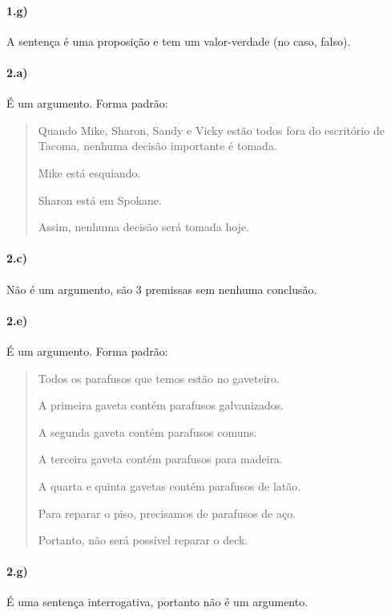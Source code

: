\documentclass[pdftex,a4paper,12pt,brazil]{article} %
\begin{document}
\paragraph{1.g)} A sentença é uma proposição e tem um valor-verdade (no caso, falso).

\paragraph{2.a)} É um argumento. Forma padrão:

\begin{quote}
  Quando Mike, Sharon, Sandy e Vicky estão todos fora do escritório de Tacoma,
  nenhuma decisão importante é tomada.

  Mike está esquiando.

  Sharon está em Spokane.
  
  \vspace{-0.5cm}
  \noindent\hrulefill
  
  Assim, nenhuma decisão será tomada hoje.
\end{quote}

\paragraph{2.c)} Não é um argumento, são 3 premissas sem nenhuma conclusão.

\paragraph{2.e)} É um argumento. Forma padrão:

\begin{quote}
  Todos os parafusos que temos estão no gaveteiro.

  A primeira gaveta contém parafusos galvanizados.

  A segunda gaveta contém parafusos comuns.

  A terceira gaveta contém parafusos para madeira.

  A quarta e quinta gavetas contém parafusos de latão.

  Para reparar o piso, precisamos de parafusos de aço.

  \vspace{-0.5cm}
  \noindent\hrulefill
  
  Portanto, não será possível reparar o deck.
\end{quote}

\paragraph{2.g)} É uma sentença interrogativa, portanto não é um argumento.
\end{document}
